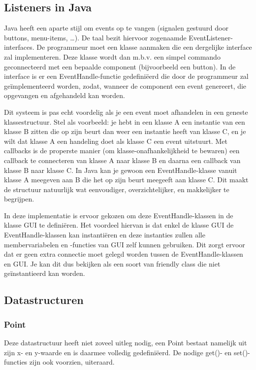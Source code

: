 \documentclass[a4paper,11pt,oneside, titlepage]{article}
\begin{document}
\subsection{Listeners in Java}
Java heeft een aparte stijl om events op te vangen (signalen gestuurd door buttons, menu-items,
\ldots). De taal bezit hiervoor zogenaamde EventListener-interfaces. De programmeur
moet een klasse aanmaken die een dergelijke interface zal implementeren. Deze klasse wordt dan
m.b.v. een simpel commando geconnecteerd met een bepaalde component (bijvoorbeeld een button).
In de interface is er een EventHandle-functie gedefini\"eerd die door de programmeur zal 
ge\"implementeerd worden, zodat, wanneer de component een event genereert,
die opgevangen en afgehandeld kan worden.\newline

Dit systeem is pas echt voordelig als je een event moet afhandelen in een geneste klassestructuur. 
Stel als voorbeeld: je hebt in een klasse A een instantie van een klasse B zitten
die op zijn beurt dan weer een instantie heeft van klasse C, en je wilt dat klasse A een handeling
doet als klasse C een event uitstuurt.
Met callbacks is de properste manier (om klasse-onafhankelijkheid te bewaren) een callback 
te connecteren van klasse A naar klasse B en daarna een callback van klasse B naar klasse C.
In Java kan je gewoon een EventHandle-klasse vanuit klasse A meegeven aan B die het op zijn 
beurt meegeeft aan klasse C. Dit maakt de structuur natuurlijk wat eenvoudiger, overzichtelijker, en makkelijker te begrijpen.\newline \newline

In deze implementatie is ervoor gekozen om deze EventHandle-klassen in de klasse GUI te 
defini\"eren. Het voordeel hiervan is dat enkel de klasse GUI de EventHandle-klassen kan 
instanti\"eren en deze instanties zullen alle membervariabelen en -functies van GUI zelf kunnen 
gebruiken. Dit zorgt ervoor dat er geen extra connectie moet gelegd worden tussen de 
EventHandle-klassen en GUI. Je kan dit dus bekijken als een soort van friendly class die niet ge\"instantieerd kan worden.
\subsection{Datastructuren}
\subsubsection{Point}
Deze datastructuur heeft niet zoveel uitleg nodig, een Point bestaat namelijk uit zijn x- en y-waarde en is daarmee
volledig gedefini\"eerd. De nodige get()- en set()-functies zijn ook voorzien, uiteraard.
\end{document}
